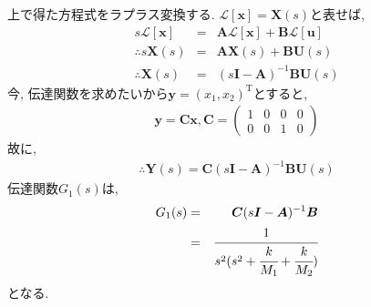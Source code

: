 \documentclass[12pt]{jsarticle}   	%
\begin{document}
\subsection{}
\noindent
上で得た方程式をラプラス変換する. $\mathcal{L}[\bm{x}] = \bm{X}(s)$と表せば, 
\begin{eqnarray}
s\mathcal{L}[\bm{x}] &=& \bm{A} \mathcal{L}[\bm{x}] + \bm{B} \mathcal{L}[\bm{u}] \\
\therefore s\bm{X}(s) &=& \bm{A}\bm{X}(s) + \bm{B}\bm{U}(s) \\
\therefore \bm{X}(s) &=& (s\bm{I}-\bm{A})^{-1}\bm{B}\bm{U}(s) 
\end{eqnarray}
今, 伝達関数を求めたいから$\bm{y} = (x_1, x_2)^{\mathrm{T}}$とすると, 
\begin{eqnarray}
\bm{y} = \bm{C}\bm{x} ,
\bm{C} = \left(
    \begin{array}{cccc}
      1 & 0 & 0 & 0 \\
      0 & 0 & 1 & 0
    \end{array}
  \right)
\end{eqnarray}
故に, 
\begin{eqnarray}
\therefore \bm{Y}(s) = \bm{C}(s\bm{I}-\bm{A})^{-1}\bm{B}\bm{U}(s) 
\end{eqnarray}
伝達関数$G_1(s)$は, 
\begin{eqnarray}
G_1(s) &=& \bm{C}(s\bm{I}-\bm{A})^{-1}\bm{B} \\
&=& \cfrac{1}{s^2(s^2 + \cfrac{k}{M_1} + \cfrac{k}{M_2})}
\end{eqnarray}
となる. 
\end{document}
